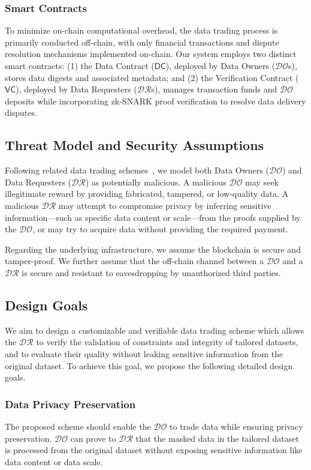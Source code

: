 \documentclass[journal]{IEEEtran}
\begin{document}
\subsubsection{\textbf{Smart Contracts}}

To minimize on-chain computational overhead, the data trading process is primarily conducted off-chain, with only financial transactions and dispute resolution mechanisms implemented on-chain. Our system employs two distinct smart contracts: 
(1) the Data Contract ($\mathsf{DC}$), deployed by Data Owners ($\mathcal{DO}$s), stores data digests and associated metadata; 
and (2) the Verification Contract ($\mathsf{VC}$), deployed by Data Requesters ($\mathcal{DR}$s), manages transaction funds and $\mathcal{DO}$ deposits while incorporating zk-SNARK proof verification to resolve data delivery disputes.

\subsection{Threat Model and Security Assumptions}\label{subsec:threat_model}
Following related data trading schemes~\cite{campanelli2017zero}, we model both Data Owners ($\mathcal{DO}$) and Data Requesters ($\mathcal{DR}$) as potentially malicious. A malicious $\mathcal{DO}$ may seek illegitimate reward by providing fabricated, tampered, or low-quality data. A malicious $\mathcal{DR}$ may attempt to compromise privacy by inferring sensitive information—such as specific data content or scale—from the proofs supplied by the $\mathcal{DO}$, or may try to acquire data without providing the required payment.

Regarding the underlying infrastructure, we assume the blockchain is secure and tamper-proof. We further assume that the off-chain channel between a $\mathcal{DO}$ and a $\mathcal{DR}$ is secure and resistant to eavesdropping by unauthorized third parties.

\subsection{Design Goals}\label{subsec:design_goals}
We aim to design a customizable and verifiable data trading scheme which allows the $\mathcal{DR}$ to verify the validation of constraints and integrity of tailored datasets, and to evaluate their quality without leaking sensitive information from the original dataset. To achieve this goal, we propose the following detailed design goals.

\subsubsection{\textbf{Data Privacy Preservation}}
The proposed scheme should enable the $\mathcal{DO}$ to trade data while ensuring privacy preservation. $\mathcal{DO}$ can prove to $\mathcal{DR}$ that the masked data in the tailored dataset is processed from the original dataset without exposing sensitive information like data content or data scale.
\end{document}

